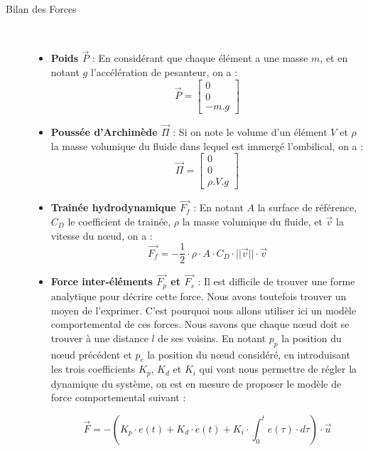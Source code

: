 				\begin{description}
					\item [Bilan des Forces] \
					\begin{itemize}
						\item[\textbullet] \textbf{Poids $\overrightarrow{P}$} : En considérant que chaque élément a une masse $m$, et en notant $g$ l'accélération de pesanteur, on a : $$\overrightarrow{P} = \begin{bmatrix}0\\ 0\\ -m.g\end{bmatrix}$$
				
						\item[\textbullet] \textbf{Poussée d'Archimède $\overrightarrow{\Pi}$} : Si on note le volume d'un élément $V$ et $\rho$ la masse volumique du fluide dans lequel est immergé l'ombilical, on a : $$\overrightarrow{\Pi} = \begin{bmatrix}0\\ 0\\ \rho.V.g\end{bmatrix}$$
				
						\item[\textbullet] \textbf{Trainée hydrodynamique $\overrightarrow{F_f}$} : En notant $A$ la surface de référence, $C_D$ le coefficient de trainée, $\rho$ la masse volumique du fluide, et $\overrightarrow{v}$ la vitesse du n\oe ud, on a : $$\overrightarrow{F_f} = - \frac{1}{2} \cdot \rho \cdot A \cdot C_D \cdot ||\overrightarrow{v}|| \cdot \overrightarrow{v}$$
						
						\item[\textbullet] \textbf{Force inter-éléments $\overrightarrow{F_p}$ et $\overrightarrow{F_s}$} : Il est difficile de trouver une forme analytique pour décrire cette force. Nous avons toutefois trouver un moyen de l'exprimer. C'est pourquoi nous allons utiliser ici un modèle comportemental de ces forces. Nous savons que chaque n\oe ud doit se trouver à une distance $l$ de ses voisins. En notant $p_{p}$ la position du n\oe ud précédent et $p_{c}$ la position du n\oe ud considéré, en introduisant les trois coefficients $K_p$, $K_d$ et $K_i$ qui vont nous permettre de régler la dynamique du système, on est en mesure de proposer le modèle de force comportemental suivant :
						
						$$\overrightarrow{F} = - \left(K_p \cdot e(t) + K_d \cdot \dot e(t) + K_i \cdot \int_{0}^te(\tau) \cdot d\tau \right) \cdot \overrightarrow{u}$$
						

\end{itemize}
\end{description}
